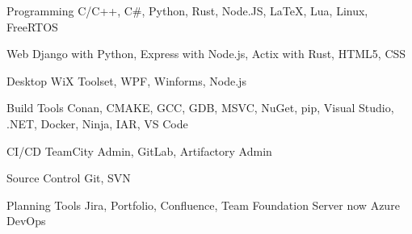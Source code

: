 

\begin{cvskills}


\cvskill
{Programming} %
{C/C++, C\#, Python, Rust, Node.JS, LaTeX, Lua, Linux, FreeRTOS} %


\cvskill
{Web} %
{Django with Python, Express with Node.js, Actix with Rust, HTML5, CSS} %


\cvskill
{Desktop} %
{WiX Toolset, WPF, Winforms, Node.js} %


\cvskill
{Build Tools} %
{Conan, CMAKE, GCC, GDB, MSVC, NuGet, pip, Visual Studio, .NET, Docker, Ninja, IAR, VS Code} %


\cvskill
{CI/CD} %
{TeamCity Admin, GitLab, Artifactory Admin} %


\cvskill
{Source Control} %
{Git, SVN} %


\cvskill
{Planning Tools} %
{Jira, Portfolio, Confluence, Team Foundation Server now Azure DevOps} %

\end{cvskills}
